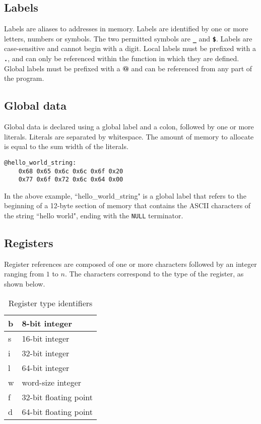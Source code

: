 \subsection{Labels}

Labels are aliases to addresses in memory.
Labels are identified by
one or more letters, numbers or symbols. The two
permitted symbols are {\LARGE \textbf{\texttt{\_}}} and \textbf{\texttt{\$}}.
Labels are case-sensitive and cannot begin with a digit.
Local labels must be prefixed with a \textbf{\texttt{.}},
and can only be referenced within the function in which they are defined.
Global labels must be prefixed with a \textbf{\textbf{@}}
and can be referenced from any part of the program.

\subsection{Global data}

Global data is declared using a global label and a colon, followed by one or more
literals. Literals are separated by whitespace. The amount of memory to allocate
is equal to the sum width of the literals.

\begin{verbatim}
@hello_world_string:
    0x68 0x65 0x6c 0x6c 0x6f 0x20
    0x77 0x6f 0x72 0x6c 0x64 0x00
\end{verbatim}

In the above example, ``hello\_world\_string" is a global label that refers
to the beginning of a 12-byte section of memory that contains
the ASCII characters of the string ``hello world", ending with the \texttt{NULL} terminator.

\subsection{Registers}

Register references are composed of one or more characters followed by an integer
ranging from $1$ to $n$. The characters correspond to the type of the register, as shown below.

\begin{table}[h!]
  \begin{center}
    \begin{tabular}{|l|l|}
      \hline
      b & 8-bit integer         \\ \hline
      s & 16-bit integer        \\ \hline
      i & 32-bit integer        \\ \hline
      l & 64-bit integer        \\ \hline
      w & word-size integer     \\ \hline
      f & 32-bit floating point \\ \hline
      d & 64-bit floating point \\ \hline
    \end{tabular}
  \end{center}
  \caption{Register type identifiers}
\end{table}


